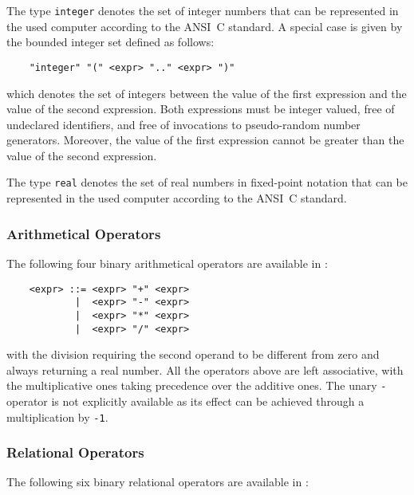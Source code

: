The type {\tt integer} denotes the set of integer numbers that can be represented in the used computer
according to the ANSI~C standard. A special case is given by the bounded integer set defined as follows:

	\begin{verbatim}
    "integer" "(" <expr> ".." <expr> ")"
	\end{verbatim}

\noindent which denotes the set of integers between the value of the first expression and the value of the
second expression. Both expressions must be integer valued, free of undeclared identifiers, and free of
invocations to pseudo-random number generators. Moreover, the value of the first expression cannot be
greater than the value of the second expression.

The type {\tt real} denotes the set of real numbers in fixed-point notation that can be represented in the
used computer according to the ANSI~C standard.


\subsubsection{Arithmetical Operators}

The following four binary arithmetical operators are available in \aemilia:

	\begin{verbatim}
    <expr> ::= <expr> "+" <expr>
            |  <expr> "-" <expr>
            |  <expr> "*" <expr>
            |  <expr> "/" <expr>
	\end{verbatim}

\noindent with the division requiring the second operand to be different from zero and always returning a
real number. All the operators above are left associative, with the multiplicative ones taking precedence
over the additive ones. The unary {\tt -} operator is not explicitly available as its effect can be achieved
through a multiplication by {\tt -1}.


\subsubsection{Relational Operators}

The following six binary relational operators are available in \aemilia:

